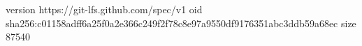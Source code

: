 version https://git-lfs.github.com/spec/v1
oid sha256:c01158adff6a25f0a2e366c249f2f78c8e97a9550df9176351abc3ddb59a68ec
size 87540
